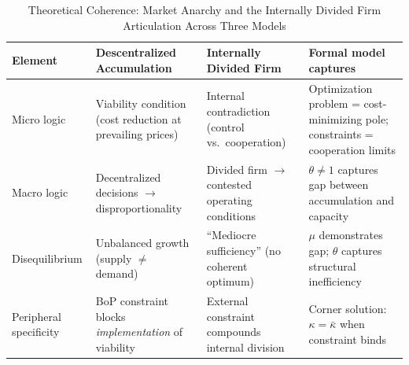 \begin{table}[H]
	\centering
	\small
	\caption{Theoretical Coherence: Market Anarchy and the Internally Divided Firm Articulation Across Three Models}
	\label{tab:coherence}
	\begin{tabular}{p{2.2cm}p{3.8cm}p{3.8cm}p{4.2cm}}
		\toprule
		\textbf{Element} & \textbf{Descentralized Accumulation} &
		\textbf{Internally Divided Firm} & \textbf{Formal model captures} \\
		\midrule
		\midrule
		Micro logic & Viability condition (cost
		reduction at prevailing prices) & Internal
		contradiction (control vs.\ cooperation) &
		Optimization problem = cost-minimizing pole;
		constraints = cooperation limits \\
		Macro logic & Decentralized decisions $\to$
		disproportionality & Divided firm $\to$
		contested operating conditions & $\theta \neq 1$
		captures gap between accumulation and capacity \\
		Disequilibrium & Unbalanced growth (supply
		$\neq$ demand) & ``Mediocre sufficiency''
		\citep{Vidal2022} (no coherent optimum) & $\mu$
		demonstrates gap; $\theta$ captures structural
		inefficiency \\
		Peripheral specificity & BoP constraint blocks
		\textit{implementation} of viability & External
		constraint compounds internal division & Corner
		solution: $\kappa = \bar{\kappa}$ when
		constraint binds \\
		\bottomrule
	\end{tabular}
\end{table}
